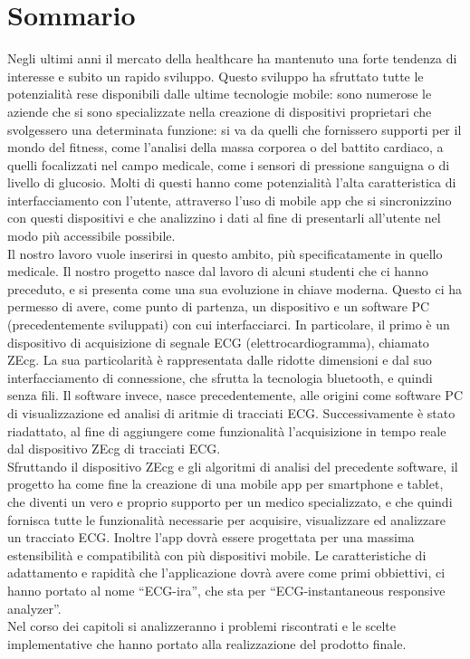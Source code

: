 \chapter{Sommario}

Negli ultimi anni il mercato della healthcare ha mantenuto una forte tendenza di interesse e subito un rapido sviluppo. Questo sviluppo ha sfruttato tutte le potenzialità rese disponibili dalle ultime tecnologie mobile: sono numerose le aziende che si sono specializzate nella creazione di dispositivi proprietari che svolgessero una determinata funzione: si va da quelli che fornissero supporti per il mondo del fitness, come l’analisi della massa corporea o del battito cardiaco, a quelli focalizzati nel campo medicale, come i sensori di pressione sanguigna o di livello di glucosio. Molti di questi hanno come potenzialità l’alta caratteristica di interfacciamento con l’utente, attraverso l’uso di mobile app che si sincronizzino con questi dispositivi e che analizzino i dati al fine di presentarli all’utente nel modo più accessibile possibile.\\
Il nostro lavoro vuole inserirsi in questo ambito, più specificatamente in quello medicale. Il nostro progetto nasce dal lavoro di alcuni studenti che ci hanno preceduto, e si presenta come una sua evoluzione in chiave moderna. Questo ci ha permesso di avere, come punto di partenza, un dispositivo e un software PC (precedentemente sviluppati) con cui interfacciarci. In particolare, il primo è un dispositivo di acquisizione di segnale ECG (elettrocardiogramma), chiamato ZEcg. La sua particolarità è rappresentata dalle ridotte dimensioni e dal suo interfacciamento di connessione, che sfrutta la tecnologia bluetooth, e quindi senza fili. Il software invece, nasce precedentemente, alle origini come software PC di visualizzazione ed analisi di aritmie di tracciati ECG. Successivamente è stato riadattato, al fine di aggiungere come funzionalità l’acquisizione in tempo reale dal dispositivo ZEcg di tracciati ECG.\\
Sfruttando il dispositivo ZEcg e gli algoritmi di analisi del precedente software, il progetto ha come fine la creazione di una mobile app per smartphone e tablet, che diventi un vero e proprio supporto per un medico specializzato, e che quindi fornisca tutte le funzionalità necessarie per acquisire, visualizzare ed analizzare un tracciato ECG. Inoltre l’app dovrà essere progettata per una massima estensibilità e compatibilità con più dispositivi mobile. Le caratteristiche di adattamento e rapidità che l’applicazione dovrà avere come primi obbiettivi, ci hanno portato al nome “ECG-ira”, che sta per “ECG-instantaneous responsive analyzer”.\\
Nel corso dei capitoli si analizzeranno i problemi riscontrati e le scelte implementative che hanno portato alla realizzazione del prodotto finale.
